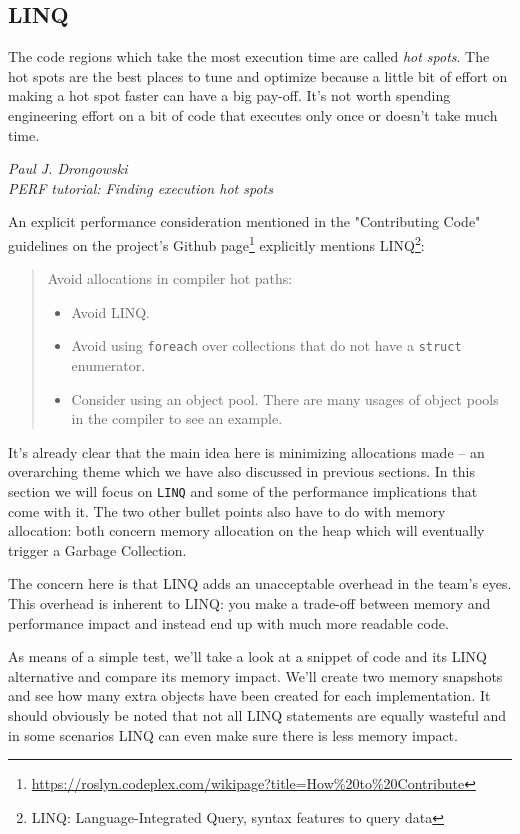 \subsection{LINQ}
\label{sec:linq}

\epigraph{The code regions which take the most execution time are called \textit{hot spots}. The hot spots are the best places to tune and optimize because a little bit of effort on making a hot spot faster can have a big pay-off. It’s not worth spending engineering effort on a bit of code that executes only once or doesn’t take much time.}
{\textit{Paul J. Drongowski \\ \footnotesize{PERF tutorial: Finding execution hot spots\protect\footnotemark}}}


An explicit performance consideration mentioned in the "Contributing Code" guidelines on the project's Github page\footnote{\url{https://roslyn.codeplex.com/wikipage?title=How\%20to\%20Contribute}} explicitly mentions LINQ\footnote{LINQ: Language-Integrated Query, syntax features to query data}:

\begin{quote}
Avoid allocations in compiler hot paths:
\begin{itemize}
\item Avoid LINQ.
\item Avoid using \verb|foreach| over collections that do not have a \verb|struct| enumerator.
\item Consider using an object pool. There are many usages of object pools in the compiler to see an example.
\end{itemize}
\end{quote}

It's already clear that the main idea here is minimizing allocations made -- an overarching theme which we have also discussed in previous sections. In this section we will focus on \verb|LINQ| and some of the performance implications that come with it. The two other bullet points also have to do with memory allocation: both concern memory allocation on the heap which will eventually trigger a Garbage Collection.

The concern here is that LINQ adds an unacceptable overhead in the team's eyes. This overhead is inherent to LINQ: you make a trade-off between memory and performance impact and instead end up with much more readable code. 

As means of a simple test, we'll take a look at a snippet of code and its LINQ alternative and compare its memory impact. We'll create two memory snapshots and see how many extra objects have been created for each implementation. It should obviously be noted that not all LINQ statements are equally wasteful and in some scenarios LINQ can even make sure there is less memory impact. 

